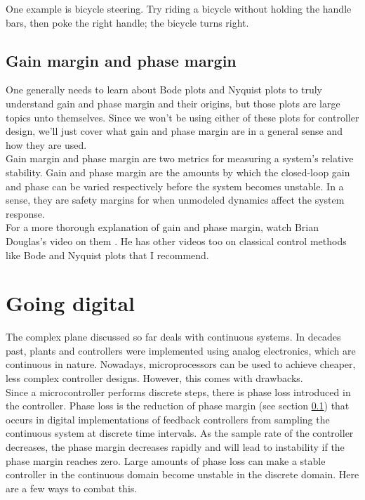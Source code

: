 One example is bicycle steering. Try riding a bicycle without holding the handle
bars, then poke the right handle; the bicycle turns right.

\subsection{Gain margin and phase margin} \label{sec:gain_phase_margin}

One generally needs to learn about Bode plots and Nyquist plots to truly
understand gain and phase margin and their origins, but those plots are large
topics unto themselves. Since we won't be using either of these plots for
controller design, we'll just cover what gain and phase margin are in a general
sense and how they are used. \\

Gain margin and phase margin are two metrics for measuring a system's relative
stability. Gain and phase margin are the amounts by which the closed-loop gain
and phase can be varied respectively before the system becomes unstable. In a
sense, they are safety margins for when unmodeled dynamics affect the system
response. \\

For a more thorough explanation of gain and phase margin, watch Brian Douglas's
video on them \cite{bib:gain_phase_margin}. He has other videos too on classical
control methods like Bode and Nyquist plots that I recommend.

\section{Going digital}

The complex plane discussed so far deals with continuous \glspl{system}. In
decades past, \glspl{plant} and controllers were implemented using analog
electronics, which are continuous in nature. Nowadays, microprocessors can be
used to achieve cheaper, less complex controller designs. However, this comes
with drawbacks. \\

Since a microcontroller performs discrete steps, there is phase loss introduced
in the controller. Phase loss is the reduction of phase margin (see section
\ref{sec:gain_phase_margin}) that occurs in digital implementations of feedback
controllers from sampling the continuous system at discrete time intervals. As
the sample rate of the controller decreases, the phase margin decreases rapidly
and will lead to instability if the phase margin reaches zero. Large amounts of
phase loss can make a stable controller in the continuous domain become unstable
in the discrete domain. Here are a few ways to combat this.

